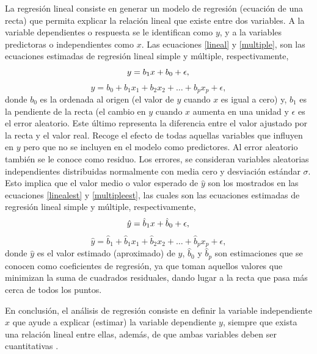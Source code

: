 \documentclass{article}
\begin{document}
La regresión lineal consiste en generar un modelo de regresión (ecuación de una recta) que permita explicar la relación lineal que existe entre dos variables. A la variable dependientes o respuesta se le identifican como $y$, y a la variables predictoras o independientes como $x$. Las ecuaciones \ref{lineal} y \ref{multiple}, son las ecuaciones estimadas de regresión lineal simple y múltiple, respectivamente,
\begin{equation}
y= b_{1}x + b_{0} + \epsilon , \\ \label{lineal}
\end{equation}
\begin{equation}
y= b_{0} + b_{1}x_{1} + b_{2}x_{2} + \dots + b_{p}x_{p} + \epsilon , \label{multiple}
\end{equation}
\noindent donde $b_{0}$ es la ordenada al origen (el valor de $y$ cuando $x$ es igual a cero) y, $b_{1}$ es la pendiente de la recta (el cambio en $y$ cuando $x$ aumenta en una unidad y $\epsilon$ es el error aleatorio. Este último representa la diferencia entre el valor ajustado por la recta y el valor real. Recoge el efecto de todas aquellas variables que influyen en $y$ pero que no se incluyen en el modelo como predictores. Al error aleatorio también se le conoce como residuo. Los errores, se consideran variables aleatorias independientes distribuidas normalmente con media cero y desviación estándar $\sigma$. Esto implica que el valor
medio o valor esperado de $\hat{y}$ son los mostrados en las ecuaciones \ref{linealest} y \ref{multipleest}, las cuales son las ecuaciones estimadas de regresión lineal simple y múltiple, respectivamente,
\begin{equation}
\hat{y}= \hat{b}_{1}x + \hat{b}_{0} + \epsilon , \\ \label{linealest}
\end{equation}
\begin{equation}
\hat{y}= \hat{b}_{1} + \hat{b}_{1}x_{1} + \hat{b}_{2}x_{2} + \dots + \hat{b}_{p}x_{p} + \epsilon ,
\label{multipleest}
\end{equation}
\noindent donde $\hat{y}$ es el valor estimado (aproximado) de $y$, $\hat{b}_{0}$ y $\hat{b}_{p}$ son estimaciones que se conocen como coeficientes de regresión, ya que toman aquellos valores que minimizan la suma de cuadrados residuales, dando lugar a la recta que pasa más cerca de todos los puntos.

En conclusión, el análisis de regresión consiste en definir la variable independiente $x$ que ayude a explicar (estimar) la variable dependiente $y$, siempre que exista una relación lineal entre ellas, además, de que ambas variables deben ser cuantitativas \cite{gutierrez}.
\end{document}
